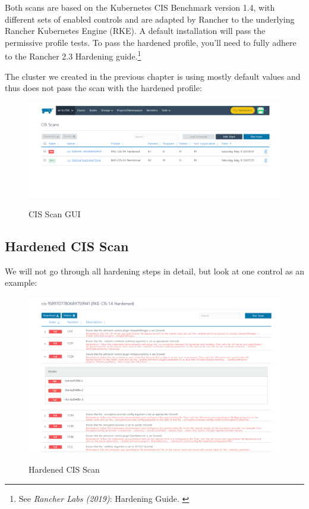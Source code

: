 Both scans are based on the Kubernetes CIS Benchmark version 1.4, with different sets of enabled controls and are adapted by Rancher to the underlying Rancher Kubernetes Engine (RKE). A default installation will pass the permissive profile tests. To pass the hardened profile, you'll need to fully adhere to the Rancher 2.3 Hardening guide.\footnote{See \textit{Rancher Labs (2019)}: Hardening Guide. \cite{hardeningGuide}}

The cluster we created in the previous chapter is using mostly default values and thus does not pass the scan with the hardened profile:

\begin{figure}[H]
\centering
\caption {CIS Scan GUI}
\includegraphics[width=\linewidth]{images/cis-scan-overview.png}
\label{fig:cisScanOverview}
\end{figure}

\subsection{Hardened CIS Scan}

We will not go through all hardening steps in detail, but look at one control as an example:

\begin{figure}[H]
\centering
\caption {Hardened CIS Scan}
\includegraphics[width=\linewidth]{images/cis-scan-fail.png}
\label{fig:cisScanFail}
\end{figure}

